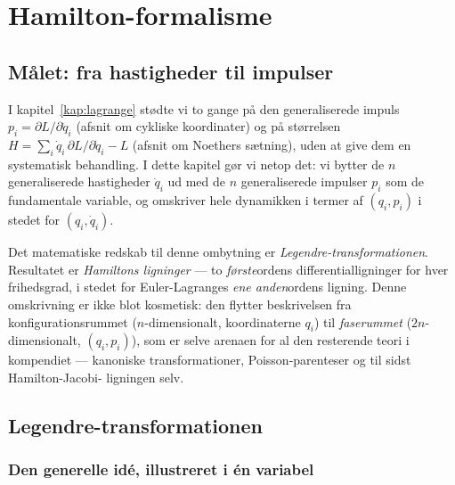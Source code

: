 
\chapter{Hamilton-formalisme}
\label{kap:hamilton}

\section{Målet: fra hastigheder til impulser}

I kapitel~\ref{kap:lagrange} stødte vi to gange på den generaliserede
impuls $p_i=\partial L/\partial\dot q_i$ (afsnit om cykliske
koordinater) og på størrelsen
$H=\sum_i\dot q_i\,\partial L/\partial\dot q_i - L$
(afsnit om Noethers sætning), uden at give dem en systematisk
behandling. I dette kapitel gør vi netop det: vi bytter de $n$
generaliserede hastigheder $\dot q_i$ ud med de $n$ generaliserede
impulser $p_i$ som de fundamentale variable, og omskriver hele
dynamikken i termer af $(q_i,p_i)$ i stedet for $(q_i,\dot q_i)$.

Det matematiske redskab til denne ombytning er
\emph{Legendre-transformationen}. Resultatet er \emph{Hamiltons
ligninger} — to \emph{første}ordens differentialligninger for hver
frihedsgrad, i stedet for Euler-Lagranges \emph{ene anden}ordens
ligning. Denne omskrivning er ikke blot kosmetisk: den flytter
beskrivelsen fra konfigurationsrummet ($n$-dimensionalt, koordinaterne
$q_i$) til \emph{faserummet} ($2n$-dimensionalt, $(q_i,p_i)$), som er
selve arenaen for al den resterende teori i kompendiet — kanoniske
transformationer, Poisson-parenteser og til sidst Hamilton-Jacobi-
ligningen selv.

\section{Legendre-transformationen}

\subsection{Den generelle idé, illustreret i én variabel}

